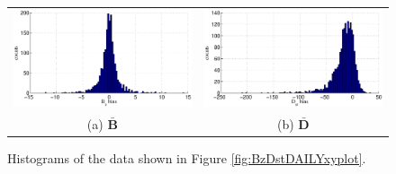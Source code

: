 \documentclass{article}[10pt]
\begin{document}
\begin{figure}[ht]
\begin{tabular}{cc}
\includegraphics[scale=0.5]{SolarExample_Bzdailyhist.eps} & \includegraphics[scale=0.5]{SolarExample_Ddailyhist.eps} \\
(a) $\bar{\mathbf{B}}$ & (b) $\bar{\mathbf{D}}$
\end{tabular}
\caption{Histograms of the data shown in Figure \ref{fig:BzDstDAILYxyplot}.}
\label{fig:BzDstDAILYxyhist}
\end{figure}
\end{document}
